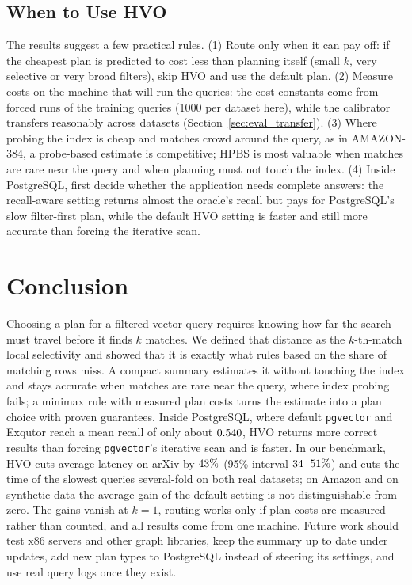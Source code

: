 \documentclass[sigconf,nonacm]{acmart}
\begin{document}
\subsection{When to Use HVO}
The results suggest a few practical rules. (1) Route only when it can pay off: if the cheapest plan is predicted to cost less than planning itself (small $k$, very selective or very broad filters), skip HVO and use the default plan. (2) Measure costs on the machine that will run the queries: the cost constants come from forced runs of the training queries (1000 per dataset here), while the calibrator transfers reasonably across datasets (Section~\ref{sec:eval_transfer}). (3) Where probing the index is cheap and matches crowd around the query, as in AMAZON-384, a probe-based estimate is competitive; HPBS is most valuable when matches are rare near the query and when planning must not touch the index. (4) Inside PostgreSQL, first decide whether the application needs complete answers: the recall-aware setting returns almost the oracle's recall but pays for PostgreSQL's slow filter-first plan, while the default HVO setting is faster and still more accurate than forcing the iterative scan.

\section{Conclusion}\label{sec:conclusion}
Choosing a plan for a filtered vector query requires knowing how far the search must travel before it finds $k$ matches. We defined that distance as the $k$-th-match local selectivity and showed that it is exactly what rules based on the share of matching rows miss. A compact summary estimates it without touching the index and stays accurate when matches are rare near the query, where index probing fails; a minimax rule with measured plan costs turns the estimate into a plan choice with proven guarantees. Inside PostgreSQL, where default \texttt{pgvector} and Exqutor reach a mean recall of only about $0.540$, HVO returns more correct results than forcing \texttt{pgvector}'s iterative scan and is faster. In our benchmark, HVO cuts average latency on arXiv by $43\%$ (95\% interval $34$--$51\%$) and cuts the time of the slowest queries several-fold on both real datasets; on Amazon and on synthetic data the average gain of the default setting is not distinguishable from zero. The gains vanish at $k=1$, routing works only if plan costs are measured rather than counted, and all results come from one machine. Future work should test x86 servers and other graph libraries, keep the summary up to date under updates, add new plan types to PostgreSQL instead of steering its settings, and use real query logs once they exist.
\end{document}
